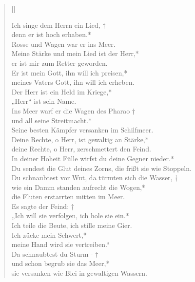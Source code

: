 \begin{verse}[\versewidth]


Ich singe dem Herrn ein Lied, †\\
denn er ist hoch erhaben.*\\
Rosse und Wagen war er ins Meer.\\
Meine Stärke und mein Lied ist der Herr,*\\
er ist mir zum Retter geworden.\\
Er ist mein Gott, ihn will ich preisen,*\\
meines Vaters Gott, ihn will ich erheben.\\

Der Herr ist ein Held im Kriege,*\\
„Herr“ ist sein Name.\\
Ins Meer warf er die Wagen des Pharao †\\
und all seine Streitmacht.*\\
Seine besten Kämpfer versanken im Schilfmeer.\\
Deine Rechte, o Herr, ist gewaltig an Stärke,*\\
deine Rechte, o Herr, zerschmettert den Feind.\\
In deiner Hoheit Fülle wirfst du deine Gegner nieder.*\\
Du sendest die Glut deines Zorns, die frißt sie wie Stoppeln.\\
Du schnaubtest vor Wut, da türmten sich die Wasser, †\\
wie ein Damm standen aufrecht die Wogen,* \\
die Fluten erstarrten mitten im Meer.\\

Es sagte der Feind: †\\
„Ich will sie verfolgen, ich hole sie ein.*\\
Ich teile die Beute, ich stille meine Gier.\\
Ich zücke mein Schwert,*\\
meine Hand wird sie vertreiben.“\\
Da schnaubtest du Sturm - †\\
und schon begrub sie das Meer,*\\
sie versanken wie Blei in gewaltigen Wassern.\\


\end{verse}
